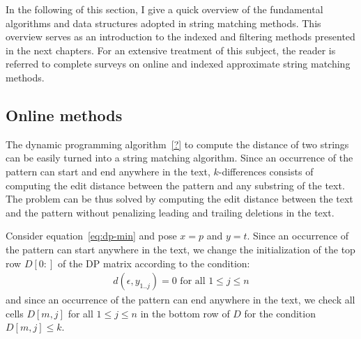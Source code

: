 
In the following of this section, I give a quick overview of the fundamental algorithms and data structures adopted in string matching methods.
This overview serves as an introduction to the indexed and filtering methods presented in the next chapters.
For an extensive treatment of this subject, the reader is referred to complete surveys on online \citep{Navarro2001b} and indexed \citep{Navarro2001} approximate string matching methods.


\subsection{Online methods}
\label{sub:introonline}





The dynamic programming algorithm~\ref{?} to compute the distance of two strings can be easily turned into a string matching algorithm.
Since an occurrence of the pattern can start and end anywhere in the text, $k$-differences consists of computing the edit distance between the pattern and any substring of the text.
The problem can be thus solved by computing the edit distance between the text and the pattern without penalizing leading and trailing deletions in the text.

Consider equation~\ref{eq:dp-min} and pose $x=p$ and $y=t$.
Since an occurrence of the pattern can start anywhere in the text, we change the initialization of the top row $D[0:]$ of the DP matrix according to the condition:
\begin{eqnarray}
d(\epsilon, y_{1..j}) = 0 \text{ for all } 1 \leq j \leq n
\end{eqnarray}
and since an occurrence of the pattern can end anywhere in the text, we check all cells $D[m,j]$ for all $1 \leq j \leq n$ in the bottom row of $D$ for the condition $D[m,j] \leq k$.

